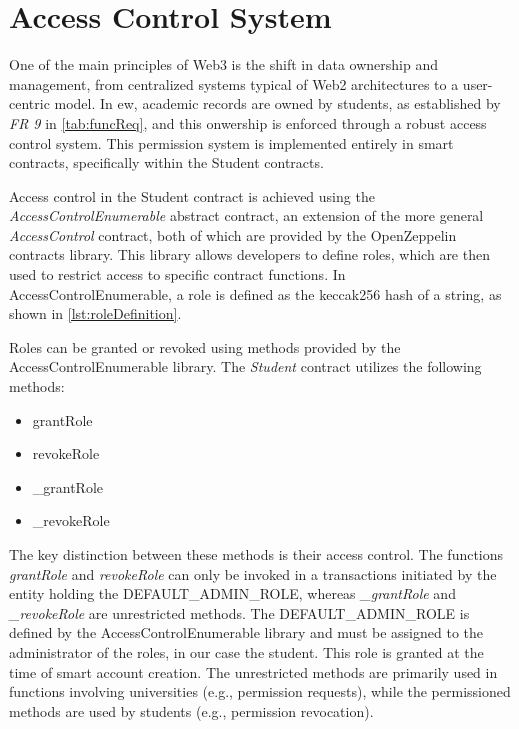 \section{Access Control System}
One of the main principles of Web3 is the shift in data ownership and management, from centralized systems typical of Web2 architectures to a user-centric model. In \acrlong{ew}, academic records are owned by students, as established by \textit{FR 9} in \cref{tab:funcReq}, and this onwership is enforced through a robust access control system. This permission system is implemented entirely in smart contracts, specifically within the Student contracts.

Access control in the Student contract is achieved using the \textit{AccessControlEnumerable} abstract contract, an extension of the more general \textit{AccessControl} contract, both of which are provided by the OpenZeppelin contracts library. This library allows developers to define roles, which are then used to restrict access to specific contract functions. In AccessControlEnumerable, a role is defined as the \Gls{keccak256} \gls{hash} of a string, as shown in \cref{lst:roleDefinition}.


Roles can be granted or revoked using methods provided by the AccessControlEnumerable library. The \textit{Student} contract utilizes the following methods:
\begin{itemize}
    \item grantRole
    \item revokeRole
    \item \_grantRole
    \item \_revokeRole
\end{itemize}
The key distinction between these methods is their access control. The functions \textit{grantRole} and \textit{revokeRole} can only be invoked in a transactions initiated by the entity holding the DEFAULT\_ADMIN\_ROLE, whereas \textit{\_grantRole} and \textit{\_revokeRole} are unrestricted methods. The DEFAULT\_ADMIN\_ROLE is defined by the AccessControlEnumerable library and must be assigned to the administrator of the roles, in our case the student. This role is granted at the time of smart account creation. The unrestricted methods are primarily used in functions involving universities (e.g., permission requests), while the permissioned methods are used by students (e.g., permission revocation).

